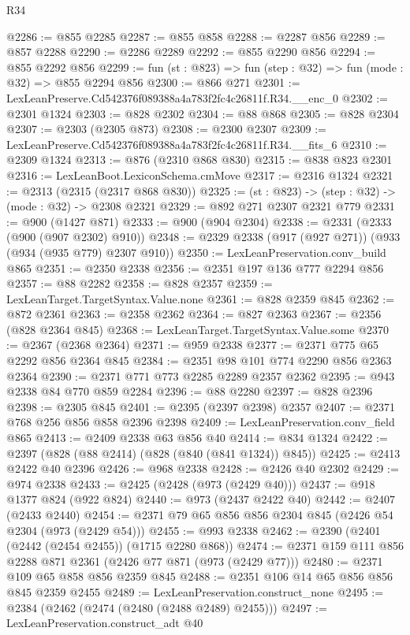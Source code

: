 \begin{lexlean}{R34}
\begin{coremodule}
@2286 := @855 @2285
@2287 := @855 @858
@2288 := @2287 @856
@2289 := @857 @2288
@2290 := @2286 @2289
@2292 := @855 @2290 @856
@2294 := @855 @2292 @856
@2299 := fun (st : @823) => fun (step : @32) => fun (mode : @32) => @855 @2294 @856
@2300 := @866 @271
@2301 := LexLeanPreserve.Cd542376f089388a4a783f2fc4c26811f.R34.__enc_0
@2302 := @2301 @1324
@2303 := @828 @2302
@2304 := @88 @868
@2305 := @828 @2304
@2307 := @2303 (@2305 @873)
@2308 := @2300 @2307
@2309 := LexLeanPreserve.Cd542376f089388a4a783f2fc4c26811f.R34.__fits_6
@2310 := @2309 @1324
@2313 := @876 (@2310 @868 @830)
@2315 := @838 @823 @2301
@2316 := LexLeanBoot.LexiconSchema.cmMove
@2317 := @2316 @1324
@2321 := @2313 (@2315 (@2317 @868 @830))
@2325 := (st : @823) -> (step : @32) -> (mode : @32) -> @2308 @2321
@2329 := @892 @271 @2307 @2321 @779
@2331 := @900 (@1427 @871)
@2333 := @900 (@904 @2304)
@2338 := @2331 (@2333 (@900 (@907 @2302) @910))
@2348 := @2329 @2338 (@917 (@927 @271)) (@933 (@934 (@935 @779) @2307 @910))
@2350 := LexLeanPreservation.conv_build @865
@2351 := @2350 @2338
@2356 := @2351 @197 @136 @777 @2294 @856
@2357 := @88 @2282
@2358 := @828 @2357
@2359 := LexLeanTarget.TargetSyntax.Value.none
@2361 := @828 @2359 @845
@2362 := @872 @2361
@2363 := @2358 @2362
@2364 := @827 @2363
@2367 := @2356 (@828 @2364 @845)
@2368 := LexLeanTarget.TargetSyntax.Value.some
@2370 := @2367 (@2368 @2364)
@2371 := @959 @2338
@2377 := @2371 @775 @65 @2292 @856 @2364 @845
@2384 := @2351 @98 @101 @774 @2290 @856 @2363 @2364
@2390 := @2371 @771 @773 @2285 @2289 @2357 @2362
@2395 := @943 @2338 @84 @770 @859 @2284
@2396 := @88 @2280
@2397 := @828 @2396
@2398 := @2305 @845
@2401 := @2395 (@2397 @2398) @2357
@2407 := @2371 @768 @256 @856 @858 @2396 @2398
@2409 := LexLeanPreservation.conv_field @865
@2413 := @2409 @2338 @63 @856 @40
@2414 := @834 @1324
@2422 := @2397 (@828 (@88 @2414) (@828 (@840 (@841 @1324)) @845))
@2425 := @2413 @2422 @40 @2396
@2426 := @968 @2338
@2428 := @2426 @40 @2302
@2429 := @974 @2338
@2433 := @2425 (@2428 (@973 (@2429 @40)))
@2437 := @918 @1377 @824 (@922 @824)
@2440 := @973 (@2437 @2422 @40)
@2442 := @2407 (@2433 @2440)
@2454 := @2371 @79 @65 @856 @856 @2304 @845 (@2426 @54 @2304 (@973 (@2429 @54)))
@2455 := @993 @2338
@2462 := @2390 (@2401 (@2442 (@2454 @2455)) (@1715 @2280 @868))
@2474 := @2371 @159 @111 @856 @2288 @871 @2361 (@2426 @77 @871 (@973 (@2429 @77)))
@2480 := @2371 @109 @65 @858 @856 @2359 @845
@2488 := @2351 @106 @14 @65 @856 @856 @845 @2359 @2455
@2489 := LexLeanPreservation.construct_none
@2495 := @2384 (@2462 (@2474 (@2480 (@2488 @2489) @2455)))
@2497 := LexLeanPreservation.construct_adt @40

\end{coremodule}
\end{lexlean}
